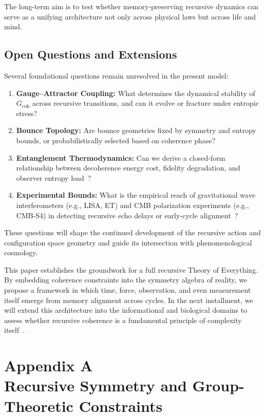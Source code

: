 \documentclass[11pt]{article}
\begin{document}
The long-term aim is to test whether memory-preserving recursive dynamics can serve as a unifying architecture not only across physical laws but across life and mind.

\subsection{Open Questions and Extensions}

Several foundational questions remain unresolved in the present model:

\begin{enumerate}[leftmargin=1.5em]
\item \textbf{Gauge–Attractor Coupling:} What determines the dynamical stability of $G_{\text{coh}}$ across recursive transitions, and can it evolve or fracture under entropic stress?
\item \textbf{Bounce Topology:} Are bounce geometries fixed by symmetry and entropy bounds, or probabilistically selected based on coherence phase?
\item \textbf{Entanglement Thermodynamics:} Can we derive a closed-form relationship between decoherence energy cost, fidelity degradation, and observer entropy load~\cite{zurek2003decoherence}?
\item \textbf{Experimental Bounds:} What is the empirical reach of gravitational wave interferometers (e.g., LISA, ET) and CMB polarization experiments (e.g., CMB-S4) in detecting recursive echo delays or early-cycle alignment~\cite{abedi2017echo, planck2018cmb}?
\end{enumerate}

These questions will shape the continued development of the recursive action and configuration space geometry and guide its intersection with phenomenological cosmology.

\bigskip

This paper establishes the groundwork for a full recursive Theory of Everything. By embedding coherence constraints into the symmetry algebra of reality, we propose a framework in which time, force, observation, and even measurement itself emerge from memory alignment across cycles. In the next installment, we will extend this architecture into the informational and biological domains to assess whether recursive coherence is a fundamental principle of complexity itself~\cite{mitchell2021complexity}.




\section*{Appendix A\\Recursive Symmetry and Group-Theoretic Constraints}
\label{appendix:A}
\end{document}
